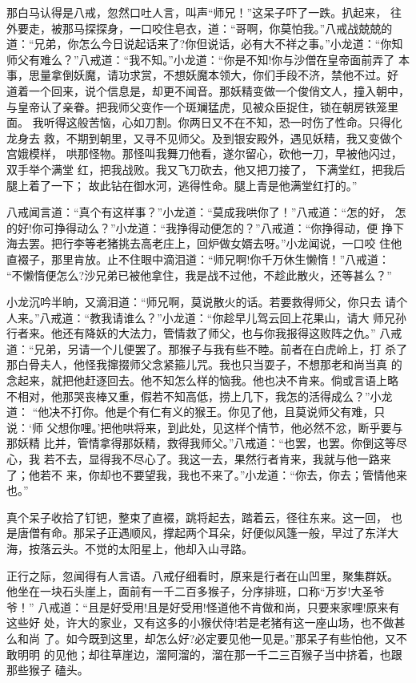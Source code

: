 那白马认得是八戒，忽然口吐人言，叫声“师兄！”这呆子吓了一跌。扒起来，
往外要走，被那马探探身，一口咬住皂衣，道：“哥啊，你莫怕我。”八戒战兢兢的
道：“兄弟，你怎么今日说起话来了?你但说话，必有大不祥之事。”小龙道：“你知
师父有难么？”八戒道：“我不知。”小龙道：“你是不知!你与沙僧在皇帝面前弄了
本事，思量拿倒妖魔，请功求赏，不想妖魔本领大，你们手段不济，禁他不过。好
道着一个回来，说个信息是，却更不闻音。那妖精变做一个俊俏文人，撞入朝中，
与皇帝认了亲眷。把我师父变作一个斑斓猛虎，见被众臣捉住，锁在朝房铁笼里面。
我听得这般苦恼，心如刀割。你两日又不在不知，恐一时伤了性命。只得化龙身去
救，不期到朝里，又寻不见师父。及到银安殿外，遇见妖精，我又变做个宫娥模样，
哄那怪物。那怪叫我舞刀他看，遂尔留心，砍他一刀，早被他闪过，双手举个满堂
红，把我战败。我又飞刀砍去，他又把刀接了，下满堂红，把我后腿上着了一下；
故此钻在御水河，逃得性命。腿上青是他满堂红打的。”

八戒闻言道：“真个有这样事？”小龙道：“莫成我哄你了！”八戒道：“怎的好，
怎的好!你可挣得动么？”小龙道：“我挣得动便怎的？”八戒道：“你挣得动，便
挣下海去罢。把行李等老猪挑去高老庄上，回炉做女婿去呀。”小龙闻说，一口咬
住他直裰子，那里肯放。止不住眼中滴泪道：“师兄啊!你千万休生懒惰！”八戒道：
“不懒惰便怎么?沙兄弟已被他拿住，我是战不过他，不趁此散火，还等甚么？”

小龙沉吟半晌，又滴泪道：“师兄啊，莫说散火的话。若要救得师父，你只去
请个人来。”八戒道：“教我请谁么？”小龙道：“你趁早儿驾云回上花果山，请大
师兄孙行者来。他还有降妖的大法力，管情救了师父，也与你我报得这败阵之仇。”
八戒道：“兄弟，另请一个儿便罢了。那猴子与我有些不睦。前者在白虎岭上，打
杀了那白骨夫人，他怪我撺掇师父念紧箍儿咒。我也只当耍子，不想那老和尚当真
的念起来，就把他赶逐回去。他不知怎么样的恼我。他也决不肯来。倘或言语上略
不相对，他那哭丧棒又重，假若不知高低，捞上几下，我怎的活得成么？”小龙道：
“他决不打你。他是个有仁有义的猴王。你见了他，且莫说师父有难，只说：‘师
父想你哩。’把他哄将来，到此处，见这样个情节，他必然不忿，断乎要与那妖精
比并，管情拿得那妖精，救得我师父。”八戒道：“也罢，也罢。你倒这等尽心，我
若不去，显得我不尽心了。我这一去，果然行者肯来，我就与他一路来了；他若不
来，你却也不要望我，我也不来了。”小龙道：“你去，你去；管情他来也。”

真个呆子收拾了钉钯，整束了直裰，跳将起去，踏着云，径往东来。这一回，
也是唐僧有命。那呆子正遇顺风，撑起两个耳朵，好便似风篷一般，早过了东洋大
海，按落云头。不觉的太阳星上，他却入山寻路。

正行之际，忽闻得有人言语。八戒仔细看时，原来是行者在山凹里，聚集群妖。
他坐在一块石头崖上，面前有一千二百多猴子，分序排班，口称“万岁!大圣爷爷！”
八戒道：“且是好受用!且是好受用!怪道他不肯做和尚，只要来家哩!原来有这些好
处，许大的家业，又有这多的小猴伏侍!若是老猪有这一座山场，也不做甚么和尚
了。如今既到这里，却怎么好?必定要见他一见是。”那呆子有些怕他，又不敢明明
的见他；却往草崖边，溜阿溜的，溜在那一千二三百猴子当中挤着，也跟那些猴子
磕头。

